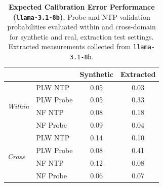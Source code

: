 \begin{table}[ht]
\centering
\begin{tabular}{ll cc}
\toprule
& & Synthetic & Extracted \\
\midrule
\multirow{4}{*}{\textit{Within}}
& PLW NTP & 0.05 & 0.03 \\
& PLW Probe & 0.05 & 0.33 \\
& NF NTP & 0.08 & 0.18 \\
& NF Probe & 0.09 & 0.04 \\
\midrule
\multirow{4}{*}{\textit{Cross}}
& PLW NTP & 0.14 & 0.10 \\
& PLW Probe & 0.08 & 0.41 \\
& NF NTP & 0.12 & 0.08 \\
& NF Probe & 0.06 & 0.07 \\
\bottomrule
\end{tabular}
\caption{\textbf{Expected Calibration Error Performance (\texttt{llama-3.1-8b}).} Probe and NTP validation probabilities evaluated within and cross-domain for synthetic and real, extraction test settings. Extracted measurements collected from \texttt{llama-3.1-8b}.}
\label{tab:llama-3.1-8b-llama-3.1-8b}
\end{table}
